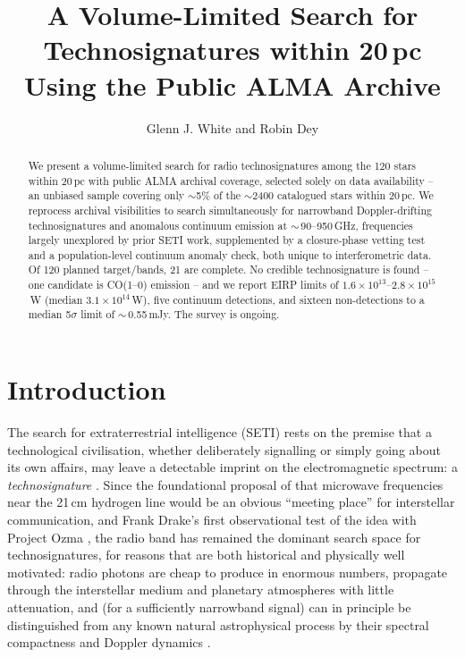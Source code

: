\documentclass{openjournal}
\begin{document}
\title{A Volume-Limited Search for Technosignatures within 20\,pc Using the Public ALMA Archive}

\author{Glenn J. White and Robin Dey}

\begin{abstract}
We present a volume-limited search for radio technosignatures among the
120 stars within 20\,pc with public ALMA archival coverage, selected
solely on data availability -- an unbiased sample covering only
$\sim$5\% of the $\sim$2400 catalogued stars within 20\,pc. We reprocess
archival visibilities to search simultaneously for narrowband
Doppler-drifting technosignatures and anomalous continuum emission at
$\sim$\,90--950\,GHz, frequencies largely unexplored by prior SETI work,
supplemented by a closure-phase vetting test and a population-level
continuum anomaly check, both unique to interferometric data. Of 120
planned target/bands, 21 are complete. No credible technosignature is
found -- one candidate is CO(1--0) emission -- and we report EIRP limits
of $1.6\times10^{13}$--$2.8\times10^{15}$\,W (median $3.1\times10^{14}$\,W),
five continuum detections, and sixteen non-detections to a median
5$\sigma$ limit of $\sim$\,0.55\,mJy. The survey is ongoing.
\end{abstract}


\section{Introduction}
\label{sec:intro}

The search for extraterrestrial intelligence (SETI) rests on the premise that a
technological civilisation, whether deliberately signalling or simply going about
its own affairs, may leave a detectable imprint on the electromagnetic spectrum: a
\emph{technosignature} \citep{Sheikh2020,SETIreview2025}. Since the foundational
proposal of \citet{CocconiMorrison1959} that microwave frequencies near the 21\,cm
hydrogen line would be an obvious ``meeting place'' for interstellar communication,
and Frank Drake's first observational test of the idea with Project Ozma
\citep{Drake1960}, the radio band has remained the dominant search space for
technosignatures, for reasons that are both historical and physically well
motivated: radio photons are cheap to produce in enormous numbers, propagate
through the interstellar medium and planetary atmospheres with little attenuation,
and (for a sufficiently narrowband signal) can in principle be distinguished from
any known natural astrophysical process by their spectral compactness and Doppler
dynamics \citep{Sheikh2020}.
\end{document}
